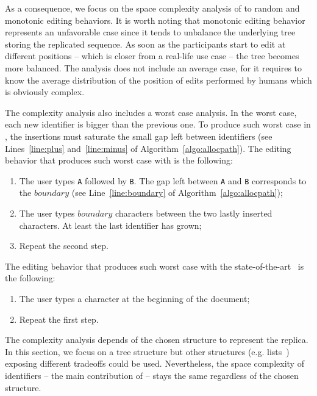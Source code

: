 \noindent As a consequence, we focus on the space complexity analysis of \LSEQ
to random and monotonic editing behaviors. It is worth noting that monotonic
editing behavior represents an unfavorable case since it tends to unbalance the
underlying tree storing the replicated sequence. As soon as the participants
start to edit at different positions -- which is closer from a real-life use
case -- the tree becomes more balanced.
The analysis does not include an average case, for it requires to know
the average distribution of the position of edits performed by humans which is
obviously complex.

\noindent The complexity analysis also includes a worst case analysis. In the
worst case, each new identifier is bigger than the previous one. To produce such
worst case in \LSEQ, the insertions must saturate the small gap left between
identifiers (see Lines~\ref{line:plus} and~\ref{line:minus} of
Algorithm~\ref{algo:allocpath}). The editing behavior that produces such worst
case with \LSEQ is the following:
\begin{enumerate}[noitemsep]
\item The user types \texttt{A} followed by \texttt{B}. The gap left between
  \texttt{A} and \texttt{B} corresponds to the $boundary$ (see
  Line~\ref{line:boundary} of Algorithm~\ref{algo:allocpath});
\item The user types $boundary$ characters between the two lastly inserted
  characters. At least the last identifier has grown;
\item Repeat the second step.
\end{enumerate}
The editing behavior that produces such worst case with the
state-of-the-art~\cite{preguica2009commutative, weiss2009logoot} is the
following:
\begin{enumerate}[noitemsep]
\item The user types a character at the beginning of the document;
\item Repeat the first step.
\end{enumerate}



The complexity analysis depends of the chosen structure to represent the
replica. In this section, we focus on a tree structure but other structures
(e.g. lists~\cite{weiss2009logoot}) exposing different tradeoffs could be
used. Nevertheless, the space complexity of identifiers -- the main contribution
of \LSEQ{} -- stays the same regardless of the chosen structure.

